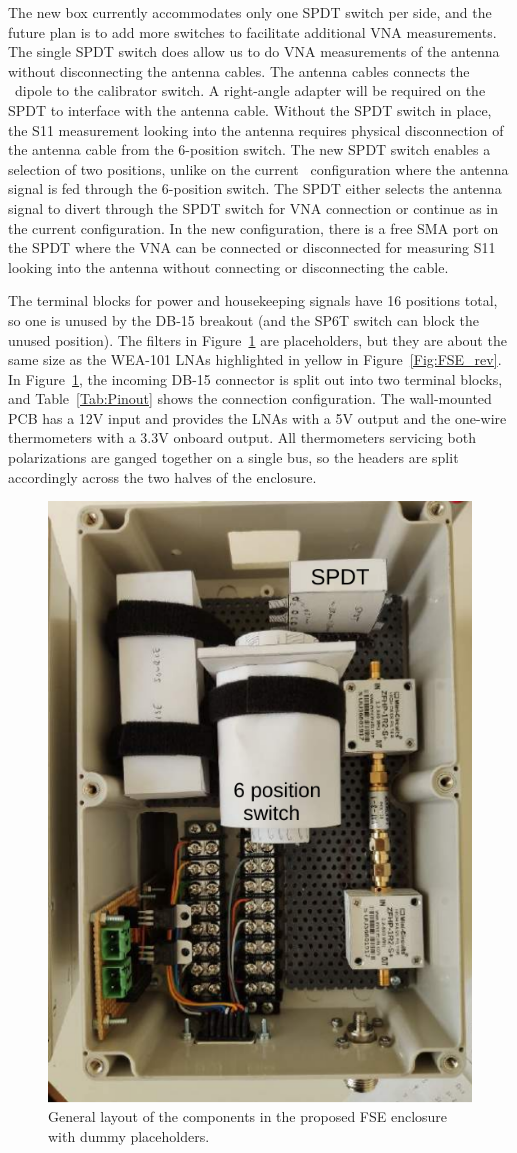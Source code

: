 The new box currently accommodates only one SPDT switch per side, and the future plan is to add more switches to facilitate additional VNA measurements. The single SPDT switch does allow us to do VNA measurements of the antenna without disconnecting the antenna cables. The antenna cables connects the \prizm\ dipole to the calibrator switch. A right-angle adapter will be required on the SPDT to interface with the antenna cable. Without the SPDT switch in place, the S11 measurement looking into the antenna requires physical disconnection of the antenna cable from the 6-position switch. The new SPDT switch enables a selection of two positions, unlike on the current \prizm\ configuration where the antenna signal is fed through the 6-position switch. The SPDT either selects the antenna signal to divert through the SPDT switch for VNA connection or continue as in the current configuration. In the new configuration, there is a free SMA port on the SPDT where the VNA can be connected or disconnected for measuring S11 looking into the antenna without connecting or disconnecting the cable. 

The terminal blocks for power and housekeeping signals have 16 positions total, so one is unused by the DB-15 breakout (and the SP6T switch can block the unused position). The filters in Figure~\ref{Fig:FSE_archi} are placeholders, but they are about the same size as the WEA-101 LNAs highlighted in yellow in Figure~\ref{Fig:FSE_rev}. In Figure~\ref{Fig:FSE_archi}, the incoming DB-15 connector is split out into two terminal blocks, and Table~\ref{Tab:Pinout} shows the connection configuration. The wall-mounted PCB has a 12V input and provides the LNAs with a 5V output and the one-wire thermometers with a 3.3V onboard output. All thermometers servicing both polarizations are ganged together on a single bus, so the headers are split accordingly across the two halves of the enclosure.

\begin{figure}
	\centering
	\includegraphics[width=0.5\linewidth]{Figures/FSE_archi}
	\caption{General layout of the components in the proposed FSE enclosure with dummy placeholders.}
	\label{Fig:FSE_archi}
\end{figure}

